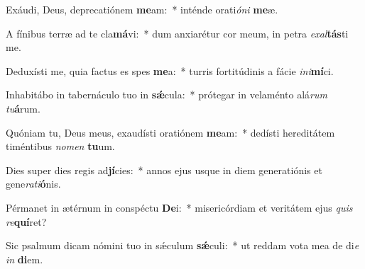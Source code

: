 \item Exáudi, Deus, deprecatiónem \textbf{me}am:~* inténde orati\textit{ó}\textit{ni} \textbf{me}æ.
\item A fínibus terræ ad te cla\textbf{má}vi:~* dum anxiarétur cor meum, in petra \textit{ex}\textit{al}\textbf{tás}ti me.
\item Deduxísti me, quia factus es spes \textbf{me}a:~* turris fortitúdinis a fácie \textit{in}\textit{i}\textbf{mí}ci.
\item Inhabitábo in tabernáculo tuo in \textbf{sǽ}cula:~* prótegar in velaménto alá\textit{rum} \textit{tu}\textbf{á}rum.
\item Quóniam tu, Deus meus, exaudísti oratiónem \textbf{me}am:~* dedísti hereditátem timéntibus \textit{no}\textit{men} \textbf{tu}um.
\item Dies super dies regis ad\textbf{jí}cies:~* annos ejus usque in diem generatiónis et gene\textit{ra}\textit{ti}\textbf{ó}nis.
\item Pérmanet in ætérnum in conspéctu \textbf{De}i:~* misericórdiam et veritátem ejus \textit{quis} \textit{re}\textbf{quí}ret?
\item Sic psalmum dicam nómini tuo in sǽculum \textbf{sǽ}culi:~* ut reddam vota mea de di\textit{e} \textit{in} \textbf{di}em.
